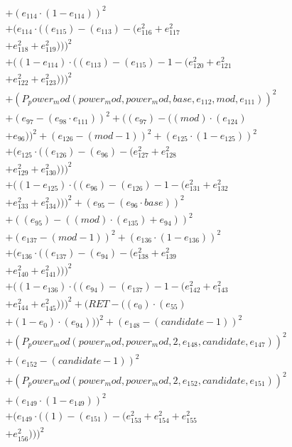 \documentclass[10pt, a4paper]{article}
\begin{document}
\begin{small}
\begin{align*}
& + (e_{114}  \cdot  (1 - e_{114}))^{2} \\
& + (e_{114}  \cdot  ((e_{115}) - (e_{113}) - (e_{116}^{2} + e_{117}^{2} \\
& + e_{118}^{2} + e_{119}^{2})))^{2} \\
& + ((1 - e_{114})  \cdot  ((e_{113}) - (e_{115}) - 1 - (e_{120}^{2} + e_{121}^{2} \\
& + e_{122}^{2} + e_{123}^{2})))^{2} \\
& + (P_power_mod(power_mod, power_mod, base, e_{112}, mod, e_{111}))^{2} \\
& + (e_{97} - (e_{98}  \cdot  e_{111}))^{2} + ((e_{97}) - ((mod)  \cdot  (e_{124}) \\
& + e_{96}))^{2} + (e_{126} - (mod - 1))^{2} + (e_{125}  \cdot  (1 - e_{125}))^{2} \\
& + (e_{125}  \cdot  ((e_{126}) - (e_{96}) - (e_{127}^{2} + e_{128}^{2} \\
& + e_{129}^{2} + e_{130}^{2})))^{2} \\
& + ((1 - e_{125})  \cdot  ((e_{96}) - (e_{126}) - 1 - (e_{131}^{2} + e_{132}^{2} \\
& + e_{133}^{2} + e_{134}^{2})))^{2} + (e_{95} - (e_{96}  \cdot  base))^{2} \\
& + ((e_{95}) - ((mod)  \cdot  (e_{135}) + e_{94}))^{2} \\
& + (e_{137} - (mod - 1))^{2} + (e_{136}  \cdot  (1 - e_{136}))^{2} \\
& + (e_{136}  \cdot  ((e_{137}) - (e_{94}) - (e_{138}^{2} + e_{139}^{2} \\
& + e_{140}^{2} + e_{141}^{2})))^{2} \\
& + ((1 - e_{136})  \cdot  ((e_{94}) - (e_{137}) - 1 - (e_{142}^{2} + e_{143}^{2} \\
& + e_{144}^{2} + e_{145}^{2})))^{2} + (RET - ((e_{0})  \cdot  (e_{55}) \\
& + (1 - e_{0})  \cdot  (e_{94})))^{2} + (e_{148} - (candidate - 1))^{2} \\
& + (P_power_mod(power_mod, power_mod, 2, e_{148}, candidate, e_{147}))^{2} \\
& + (e_{152} - (candidate - 1))^{2} \\
& + (P_power_mod(power_mod, power_mod, 2, e_{152}, candidate, e_{151}))^{2} \\
& + (e_{149}  \cdot  (1 - e_{149}))^{2} \\
& + (e_{149}  \cdot  ((1) - (e_{151}) - (e_{153}^{2} + e_{154}^{2} + e_{155}^{2} \\
& + e_{156}^{2})))^{2} \\

\end{align*}
\end{small}
\end{document}
